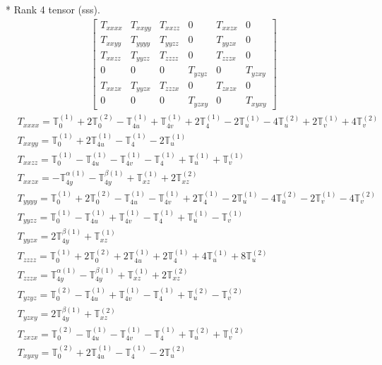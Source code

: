 \documentclass[fleqn,8pt,landscape]{jsarticle}
\begin{document}
* Rank 4 tensor (sss).
\begin{align*}
\begin{bmatrix} T_{xxxx} & T_{xxyy} & T_{xxzz} & 0 & T_{xxzx} & 0 \\ T_{xxyy} & T_{yyyy} & T_{yyzz} & 0 & T_{yyzx} & 0 \\ T_{xxzz} & T_{yyzz} & T_{zzzz} & 0 & T_{zzzx} & 0 \\ 0 & 0 & 0 & T_{yzyz} & 0 & T_{yzxy} \\ T_{xxzx} & T_{yyzx} & T_{zzzx} & 0 & T_{zxzx} & 0 \\ 0 & 0 & 0 & T_{yzxy} & 0 & T_{xyxy} \end{bmatrix}
\end{align*}
\begin{align*}
& T_{xxxx} = \mathbb{T}_{0}^{(1)} + 2 \mathbb{T}_{0}^{(2)} - \mathbb{T}_{4u}^{(1)} + \mathbb{T}_{4v}^{(1)} + 2 \mathbb{T}_{4}^{(1)} - 2 \mathbb{T}_{u}^{(1)} - 4 \mathbb{T}_{u}^{(2)} + 2 \mathbb{T}_{v}^{(1)} + 4 \mathbb{T}_{v}^{(2)} \\
& T_{xxyy} = \mathbb{T}_{0}^{(1)} + 2 \mathbb{T}_{4u}^{(1)} - \mathbb{T}_{4}^{(1)} - 2 \mathbb{T}_{u}^{(1)} \\
& T_{xxzz} = \mathbb{T}_{0}^{(1)} - \mathbb{T}_{4u}^{(1)} - \mathbb{T}_{4v}^{(1)} - \mathbb{T}_{4}^{(1)} + \mathbb{T}_{u}^{(1)} + \mathbb{T}_{v}^{(1)} \\
& T_{xxzx} = - \mathbb{T}_{4y}^{\alpha(1)} - \mathbb{T}_{4y}^{\beta(1)} + \mathbb{T}_{xz}^{(1)} + 2 \mathbb{T}_{xz}^{(2)} \\
& T_{yyyy} = \mathbb{T}_{0}^{(1)} + 2 \mathbb{T}_{0}^{(2)} - \mathbb{T}_{4u}^{(1)} - \mathbb{T}_{4v}^{(1)} + 2 \mathbb{T}_{4}^{(1)} - 2 \mathbb{T}_{u}^{(1)} - 4 \mathbb{T}_{u}^{(2)} - 2 \mathbb{T}_{v}^{(1)} - 4 \mathbb{T}_{v}^{(2)} \\
& T_{yyzz} = \mathbb{T}_{0}^{(1)} - \mathbb{T}_{4u}^{(1)} + \mathbb{T}_{4v}^{(1)} - \mathbb{T}_{4}^{(1)} + \mathbb{T}_{u}^{(1)} - \mathbb{T}_{v}^{(1)} \\
& T_{yyzx} = 2 \mathbb{T}_{4y}^{\beta(1)} + \mathbb{T}_{xz}^{(1)} \\
& T_{zzzz} = \mathbb{T}_{0}^{(1)} + 2 \mathbb{T}_{0}^{(2)} + 2 \mathbb{T}_{4u}^{(1)} + 2 \mathbb{T}_{4}^{(1)} + 4 \mathbb{T}_{u}^{(1)} + 8 \mathbb{T}_{u}^{(2)} \\
& T_{zzzx} = \mathbb{T}_{4y}^{\alpha(1)} - \mathbb{T}_{4y}^{\beta(1)} + \mathbb{T}_{xz}^{(1)} + 2 \mathbb{T}_{xz}^{(2)} \\
& T_{yzyz} = \mathbb{T}_{0}^{(2)} - \mathbb{T}_{4u}^{(1)} + \mathbb{T}_{4v}^{(1)} - \mathbb{T}_{4}^{(1)} + \mathbb{T}_{u}^{(2)} - \mathbb{T}_{v}^{(2)} \\
& T_{yzxy} = 2 \mathbb{T}_{4y}^{\beta(1)} + \mathbb{T}_{xz}^{(2)} \\
& T_{zxzx} = \mathbb{T}_{0}^{(2)} - \mathbb{T}_{4u}^{(1)} - \mathbb{T}_{4v}^{(1)} - \mathbb{T}_{4}^{(1)} + \mathbb{T}_{u}^{(2)} + \mathbb{T}_{v}^{(2)} \\
& T_{xyxy} = \mathbb{T}_{0}^{(2)} + 2 \mathbb{T}_{4u}^{(1)} - \mathbb{T}_{4}^{(1)} - 2 \mathbb{T}_{u}^{(2)}
\end{align*}
\end{document}
